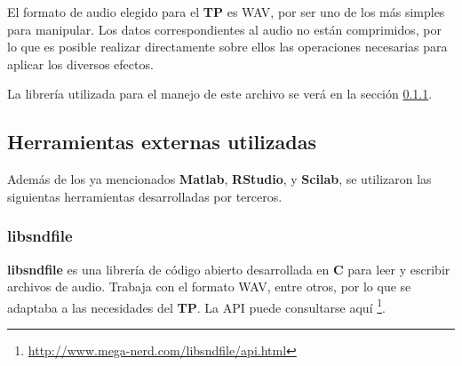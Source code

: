 \documentclass[a4paper,spanish,12pt]{article}
\begin{document}
El formato de audio elegido para el \textbf{TP} es WAV, por ser uno de los más simples para manipular. Los datos correspondientes al audio no están comprimidos, por lo que es posible realizar directamente sobre ellos las operaciones necesarias para aplicar los diversos efectos. \vspace{\baselineskip}

La librería utilizada para el manejo de este archivo se verá en la sección \ref{subsec:libsndfile}.\vspace{\baselineskip}


\newpage\subsection{Herramientas externas utilizadas}
\label{subsec:herramientas}
Además de los ya mencionados \textbf{Matlab}, \textbf{RStudio}, y \textbf{Scilab}, se utilizaron las siguientas herramientas desarrolladas por terceros.

\subsubsection{libsndfile}
\label{subsec:libsndfile}
\textbf{libsndfile} es una librería de código abierto desarrollada en \textbf{C} para leer y escribir archivos de audio. Trabaja con el formato WAV, entre otros, por lo que se adaptaba a las necesidades del \textbf{TP}. La API puede consultarse aquí \footnote{\url{http://www.mega-nerd.com/libsndfile/api.html}}.\vspace{\baselineskip}
\end{document}
